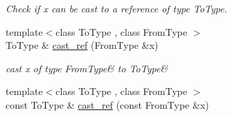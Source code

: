 \begin{DoxyCompactItemize}
\begin{DoxyCompactList}\small\item\em Check if x can be cast to a reference of type To\+Type. \end{DoxyCompactList}\item 
{\footnotesize template$<$class To\+Type , class From\+Type $>$ }\\To\+Type \& \hyperlink{namespaceSpacy_abb0550fc1d402f00e42c165ae8eb3305}{cast\+\_\+ref} (From\+Type \&x)\hypertarget{namespaceSpacy_abb0550fc1d402f00e42c165ae8eb3305}{}\label{namespaceSpacy_abb0550fc1d402f00e42c165ae8eb3305}

\begin{DoxyCompactList}\small\item\em cast x of type \textquotesingle{}From\+Type\&\textquotesingle{} to \textquotesingle{}To\+Type\&\textquotesingle{} \end{DoxyCompactList}\item 
{\footnotesize template$<$class To\+Type , class From\+Type $>$ }\\const To\+Type \& \hyperlink{namespaceSpacy_a00fc9d674cd8813c4e20a05adf3aaaa4}{cast\+\_\+ref} (const From\+Type \&x)\hypertarget{namespaceSpacy_a00fc9d674cd8813c4e20a05adf3aaaa4}{}\label{namespaceSpacy_a00fc9d674cd8813c4e20a05adf3aaaa4}


\end{DoxyCompactItemize}
